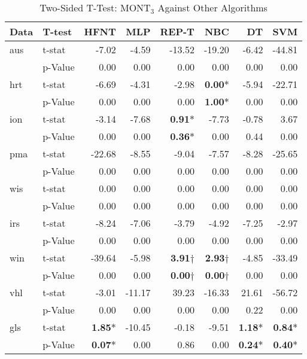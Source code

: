 \documentclass[conference]{IEEEtran}
\begin{document}
\begin{table}
    \begin{center}
        \renewcommand{\arraystretch}{1}
        \setlength{\tabcolsep}{5pt}
        {\caption{Two-Sided T-Test: MONT$_3$ Against Other Algorithms}
            \label{tab:nt_vs_all_ttest}}
        \begin{tabular}{llrrrrrr}\hline
            Data & T-test & HFNT & MLP & REP-T & NBC & DT & SVM \\
            \hline
            aus & t-stat & -7.02 & -4.59 & -13.52 & -19.20 & -6.42 & -44.81 \\
             & p-Value & 0.00 & 0.00 & 0.00 & 0.00 & 0.00 & 0.00 \\
            hrt & t-stat & -6.69 & -4.31 & -2.98 & \textbf{0.00}$*$ & -5.94 & -22.71 \\
             & p-Value & 0.00 & 0.00 & 0.00 & \textbf{1.00}$*$ & 0.00 & 0.00 \\
            ion & t-stat & -3.14 & -7.68 & \textbf{0.91}$*$ & -7.73 & -0.78 & 3.67 \\
             & p-Value & 0.00 & 0.00 & \textbf{0.36}$*$ & 0.00 & 0.44 & 0.00 \\
            pma & t-stat & -22.68 & -8.55 & -9.04 & -7.57 & -8.28 & -25.65 \\
             & p-Value & 0.00 & 0.00 & 0.00 & 0.00 & 0.00 & 0.00 \\
            wis & t-stat & 0.00 & 0.00 & 0.00 & 0.00 & 0.00 & 0.00 \\
             & p-Value & 0.00 & 0.00 & 0.00 & 0.00 & 0.00 & 0.00 \\
            irs & t-stat & -8.24 & -7.06 & -3.79 & -4.92 & -7.25 & -2.97 \\
            & p-Value & 0.00 & 0.00 & 0.00 & 0.00 & 0.00 & 0.00 \\
            win & t-stat & -39.64 & -5.98 & \textbf{3.91}$\dagger $ & \textbf{2.93}$\dagger $ & -4.85 & -33.49 \\
             & p-Value & 0.00 & 0.00 & \textbf{0.00}$\dagger $ & \textbf{0.00}$\dagger $ & 0.00 & 0.00 \\
            vhl & t-stat & -3.01 & -11.17 & 39.23 & -16.33 & 21.61 & -56.72 \\
             & p-Value & 0.00 & 0.00 & 0.00 & 0.00 & 0.22 & 0.00 \\
            gls & t-stat & \textbf{1.85}$*$ & -10.45 & -0.18 & -9.51 & \textbf{1.18}$*$ & \textbf{0.84}$*$ \\
             & p-Value & \textbf{0.07}$*$ & 0.00 & 0.86 & 0.00 & \textbf{0.24}$*$ & \textbf{0.40}$*$ \\ 

\end{tabular}
\end{center}
\end{table}
\end{document}
